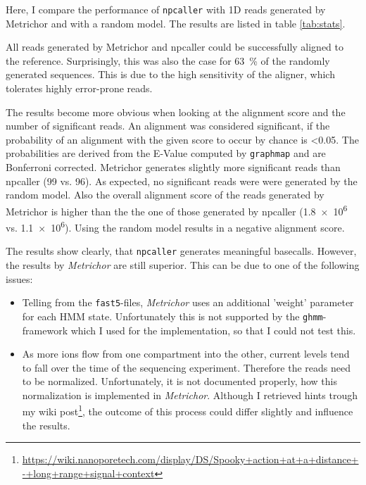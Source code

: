 \documentclass[]{scrartcl}
\begin{document}
Here, I compare the performance of \texttt{npcaller} with 1D reads generated by Metrichor and with a random model. The results are listed in table \ref{tab:stats}. 

All reads generated by Metrichor and npcaller could be successfully aligned to the reference. Surprisingly, this was also the case for \SI{63}{\percent} of the randomly generated sequences. This is due to the high sensitivity of the aligner, which tolerates highly error-prone reads. 

The results become more obvious when looking at the alignment score and the number of significant reads. An alignment was considered significant, if the probability of an alignment with the given score to occur by chance is \num{<0.05}. The probabilities are derived from the E-Value computed by \texttt{graphmap} and are Bonferroni corrected. Metrichor generates slightly more significant reads than npcaller (99 vs. 96). As expected, no significant reads were were generated by the random model. Also the overall alignment score of the reads generated by Metrichor is higher than the the one of those generated by npcaller (\num{1.8e6} vs. \num{1.1e6}). Using the random model results in a negative alignment score. 

The results show clearly, that \texttt{npcaller} generates meaningful basecalls. However, the results by \textit{Metrichor} are still superior. This can be due to one of the following issues: 
\begin{itemize}
\item Telling from the \texttt{fast5}-files, \textit{Metrichor} uses an additional 'weight' parameter for each HMM state. Unfortunately this is not supported by the \texttt{ghmm}-framework which I used for the implementation, so that I could not test this. 
\item As more ions flow from one compartment into the other, current levels tend to fall over the time of the sequencing experiment. Therefore the reads need to be normalized. Unfortunately, it is not documented properly, how this normalization is implemented in \textit{Metrichor}. Although I retrieved hints trough my wiki post\footnote{\url{https://wiki.nanoporetech.com/display/DS/Spooky+action+at+a+distance+-+long+range+signal+context}}, the outcome of this process could differ slightly and influence the results. 
\end{itemize}
\end{document}
